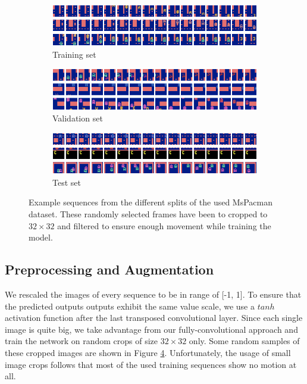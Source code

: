 \begin{figure}[h!tb]
\centering
\begin{subfigure}{1.0\textwidth}
  \centering
  \includegraphics[width=1.0\linewidth]{figures/ds/pac_train.png}
  \caption{Training set}
  \label{fig:pac_train}
  \vspace{.1cm}
\end{subfigure}
\begin{subfigure}{1.0\textwidth}
  \centering
  \includegraphics[width=1.0\linewidth]{figures/ds/pac_valid.png}
  \caption{Validation set}
  \label{fig:pac_valid}
  \vspace{.1cm}
\end{subfigure}
\begin{subfigure}{1.0\textwidth}
  \centering
  \includegraphics[width=1.0\linewidth]{figures/ds/pac_test.png}
  \caption{Test set}
  \label{fig:pac_test}
\end{subfigure}
\caption[MsPacman Crop Image Samples]{Example sequences from the different splits of the used MsPacman dataset. These randomly selected frames have been to cropped to $32 \times 32 $ and filtered to ensure enough movement while training the model.}
\label{fig:pacman}
\end{figure}


\subsection{Preprocessing and Augmentation} \label{sec:pacman_preprocessing}

We rescaled the images of every sequence to be in range of [-1, 1]. To ensure that the predicted outputs outputs exhibit the same value scale, we use a $tanh$ activation function after the last transposed convolutional layer. Since each single image is quite big, we take advantage from our fully-convolutional approach and train the network on random crops of size $ 32 \times 32 $ only. Some random samples of these cropped images are shown in Figure \ref{fig:pacman}. Unfortunately, the usage of small image crops follows that most of the used training sequences show no motion at all.

